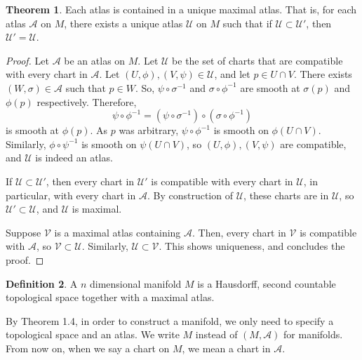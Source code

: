 \documentclass[]{article}
\theoremstyle{definition}
\newtheorem{theorem}{Theorem}[section] %
\theoremstyle{definition}
\newtheorem{definition}[theorem]{Definition} %
\begin{document}
\begin{theorem}
    Each atlas is contained in a unique maximal atlas. That is, for each atlas $\mathcal{A}$ on $M$, there exists a unique atlas $\mathcal{U}$ on $M$ such that if $\mathcal{U}\subset\mathcal{U}'$, then $\mathcal{U}'=\mathcal{U}$.
\end{theorem}

\begin{proof}
    Let $\mathcal{A}$ be an atlas on $M$. Let $\mathcal{U}$ be the set of charts that are compatible with every chart in $\mathcal{A}$. Let $(U, \phi), (V, \psi)\in \mathcal{U}$, and let $p\in U\cap V$. There exists $(W, \sigma)\in \mathcal{A}$ such that $p\in W$. So, $\psi\circ\sigma^{-1}$ and $\sigma\circ\phi^{-1}$ are smooth at $\sigma(p)$ and $\phi(p)$ respectively. Therefore, \[\psi\circ\phi^{-1} = (\psi\circ\sigma^{-1})\circ(\sigma\circ\phi^{-1})\] is smooth at $\phi(p)$. As $p$ was arbitrary, $\psi\circ\phi^{-1}$ is smooth on $\phi(U\cap V)$. Similarly, $\phi\circ\psi^{-1}$ is smooth on $\psi(U\cap V)$, so $(U, \phi), (V, \psi)$ are compatible, and $\mathcal{U}$ is indeed an atlas.
    
    If $\mathcal{U}\subset \mathcal{U}'$, then every chart in $\mathcal{U}'$ is compatible with every chart in $\mathcal{U}$, in particular, with every chart in $\mathcal{A}$. By construction of $\mathcal{U}$, these charts are in $\mathcal{U}$, so $\mathcal{U}'\subset \mathcal{U}$, and $\mathcal{U}$ is maximal.

    Suppose $\mathcal{V}$ is a maximal atlas containing $\mathcal{A}$. Then, every chart in $\mathcal{V}$ is compatible with $\mathcal{A}$, so $\mathcal{V}\subset \mathcal{U}$. Similarly, $\mathcal{U}\subset \mathcal{V}$. This shows uniqueness, and concludes the proof.
\end{proof}

\begin{definition}
    A $n$ dimensional manifold $M$ is a Hausdorff, second countable topological space together with a maximal atlas.
\end{definition}

By Theorem 1.4, in order to construct a manifold, we only need to specify a topological space and an atlas. We write $M$ instead of $(M, \mathcal{A})$ for manifolds. From now on, when we say a chart on $M$, we mean a chart in $\mathcal{A}$.
\end{document}
